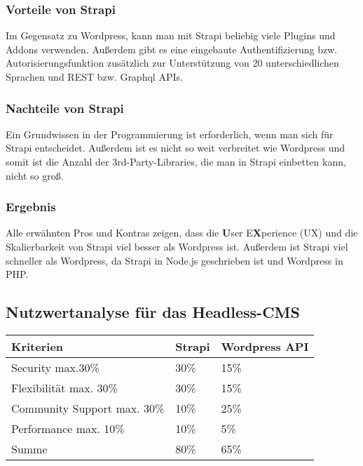 \begin{spacing}{1}
    \subsubsection{Vorteile von Strapi}

    Im Gegensatz zu Wordpress, kann man mit Strapi beliebig viele Plugins und Addons
    verwenden. Außerdem gibt es eine eingebaute Authentifizierung bzw. Autorisierungsfunktion
    zusätzlich zur Unterstützung von 20 unterschiedlichen Sprachen und REST
    bzw. Graphql APIs.
    \cite{strapi-vs-wordpress}

    \subsubsection{Nachteile von Strapi}
    Ein Grundwissen in der Programmierung ist erforderlich, wenn man sich für Strapi
    entscheidet. Außerdem ist es nicht so weit verbreitet wie Wordpress und somit ist die Anzahl
    der 3rd-Party-Libraries, die man in Strapi einbetten kann, nicht so groß.
    \cite{strapi-vs-wordpress}

    \subsubsection{Ergebnis}
    Alle erwähnten Pros und Kontras zeigen, dass  die \textbf{U}ser E\textbf{X}perience (UX)
    und die Skalierbarkeit von Strapi viel besser als Wordpress ist.
    Außerdem ist Strapi viel schneller als Wordpress,
    da Strapi in Node.js geschrieben ist und Wordpress in PHP.
    \cite{strapi-vs-wordpress}

    \subsection{Nutzwertanalyse für das Headless-CMS}

    \begin{tabular}{ |p{3cm}|p{3cm}|p{3cm}| }
        \hline
        Kriterien                   & Strapi & Wordpress API \\
        \hline
        Security max.30\%           & 30\%   & 15\%          \\
        \hline
        Flexibilität max. 30\%      & 30\%   & 15\%          \\
        \hline
        Community Support max. 30\% & 10\%   & 25\%          \\
        \hline
        Performance max. 10\%       & 10\%   & 5\%           \\
        \hline
        Summe                       & 80\%   & 65\%          \\
        \hline
    \end{tabular}


\end{spacing}

